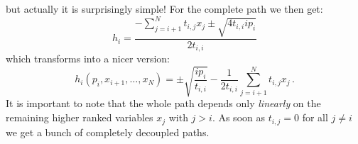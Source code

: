 \documentclass[a4paper,10pt]{article}
\begin{document}
but actually it is surprisingly simple!
For the complete path we then get:
\begin{equation}
  h_i = \frac{-\sum_{j=i+1}^{N} t_{i,j} x_j \pm \sqrt{4 t_{i,i} i p_i}}
             {2 t_{i,i}}
\end{equation}
which transforms into a nicer version:
\begin{equation} \label{eq:general_path_formula}
\boxed{
  h_i\left(p_i, x_{i+1}, \ldots, x_N\right)
  =
  \pm \sqrt{\frac{i p_i}{t_{i,i}}}
  -\frac{1}{2 t_{i,i}} \sum_{j=i+1}^{N} t_{i,j} x_j
  \,.
}
\end{equation}
It is important to note that the whole path depends only \emph{linearly}
on the remaining higher ranked variables $x_j$ with $j>i$.
As soon as $t_{i,j} = 0$ for all $j \neq i$ we get a bunch of
completely decoupled paths.
\end{document}

